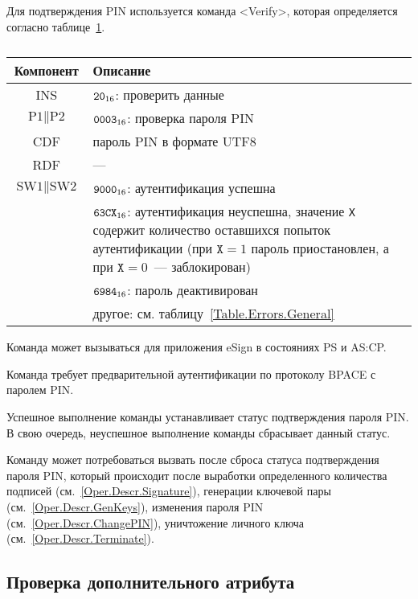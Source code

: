 Для подтверждения PIN используется команда
<Verify>, которая определяется согласно 
таблице~\ref{Table.Oper.VerifyPINCmd}.

\begin{table}[hbt]
\caption{}\label{Table.Oper.VerifyPINCmd}
\begin{tabular}{|c|p{14cm}|}
\hline
Компонент & Описание \\
\hline
\hline
INS & $\texttt{20}_{16}$: проверить данные\\
\hline
$\text{P1} \parallel \text{P2}$ & $\texttt{0003}_{16}$: 
проверка пароля PIN\\
\hline
CDF & пароль PIN в формате UTF8 \\
\hline 
RDF &  --- \\
\hline
$\text{SW1} \parallel \text{SW2}$ & $\texttt{9000}_{16}$: аутентификация успешна\\
 & $\texttt{63CX}_{16}$: аутентификация неуспешна, значение \texttt{X} содержит количество 
оставшихся попыток аутентификации (при $\texttt{X} = 1$ пароль 
приостановлен, а при $\texttt{X} = 0$~--- заблокирован)\\
& $\texttt{6984}_{16}$: пароль деактивирован \\
 & другое: см. таблицу~\ref{Table.Errors.General} \\
\hline
\end{tabular}
\end{table}

Команда может вызываться для приложения eSign
в состояниях PS и AS:CP.

Команда требует предварительной аутентификации по 
протоколу BPACE с паролем PIN.

Успешное выполнение команды устанавливает 
статус подтверждения пароля PIN.
В свою очередь, неуспешное выполнение команды 
сбрасывает данный статус.

Команду может потребоваться вызвать после сброса статуса
подтверждения пароля PIN, который происходит 
после выработки определенного количества подписей (см.~\ref{Oper.Descr.Signature}),
генерации ключевой пары (см.~\ref{Oper.Descr.GenKeys}),
изменения пароля PIN (см.~\ref{Oper.Descr.ChangePIN}),
уничтожение личного ключа (см.~\ref{Oper.Descr.Terminate}).

\subsection{Проверка дополнительного атрибута}
\label{Oper.Descr.VerifyData}

